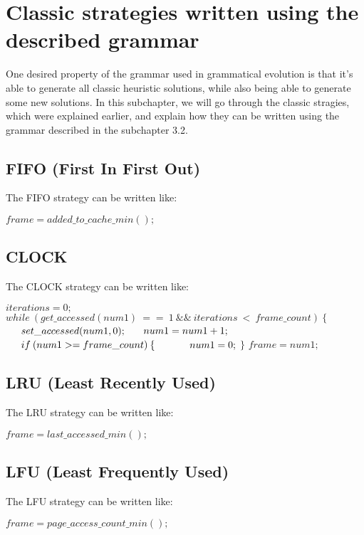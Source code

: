 \section{Classic strategies written using the described grammar}
One desired property of the grammar used in grammatical evolution is that it's able to generate all classic heuristic solutions, while also being able to generate some new solutions. In this subchapter, we will go through the classic stragies, which were explained earlier, and explain how they can be written using the grammar described in the subchapter 3.2.

\subsection{FIFO (First In First Out)}

The FIFO strategy can be written like:

\noindent
\begin{algorithmic}
\State $frame = added\_to\_cache\_min();$
\end{algorithmic}

\subsection{CLOCK}

The CLOCK strategy can be written like:

\noindent
\begin{algorithmic}
\State $ iterations = 0;$
\State $ while\:(get\_accessed(num1)\:==\:1\:\&\& \:iterations \:<\:frame\_count)\:\{$
\State $ \indent set\_accessed(num1, 0);$
\State $ \indent num1 = num1 + 1;$
\State $ \indent if\:(num1 >= frame\_count)\:\{$
\State $ \indent\indent num1 = 0;$
\State $ \}$
\State $frame = num1;$
\end{algorithmic}

\subsection{LRU (Least Recently Used)}

The LRU strategy can be written like:

\noindent
\begin{algorithmic}
\State $frame = last\_accessed\_min();$
\end{algorithmic}

\subsection{LFU (Least Frequently Used)}

The LFU strategy can be written like:

\noindent
\begin{algorithmic}
\State $frame = page\_access\_count\_min();$
\end{algorithmic}